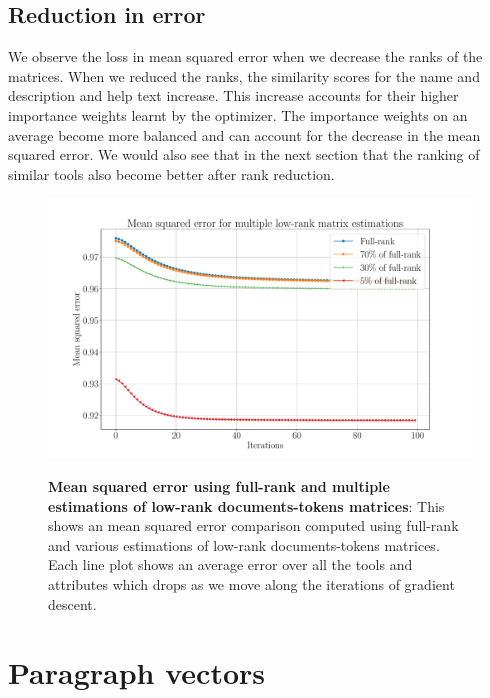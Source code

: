 \subsection{Reduction in error}
We observe the loss in mean squared error when we decrease the ranks of the matrices. When we reduced the ranks, the similarity scores for the name and description and help text increase. This increase accounts for their higher importance weights learnt by the optimizer. The importance weights on an average become more balanced and can account for the decrease in the mean squared error. We would also see that in the next section that the ranking of similar tools also become better after rank reduction.

\begin{figure}[h]
\begin{centering}
    {\includegraphics[scale=0.35]{figures/MSE_iterations_low_rank.pdf}}
    \caption[Mean squared error using LSI]{\textbf{Mean squared error using full-rank and multiple estimations of low-rank documents-tokens matrices}: This shows an mean squared error comparison computed using full-rank and various estimations of low-rank documents-tokens matrices. Each line plot shows an average error over all the tools and attributes which drops as we move along the iterations of gradient descent.}
\end{centering}
\end{figure}

\section{Paragraph vectors}

